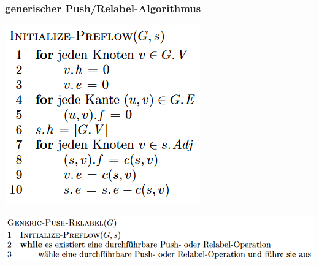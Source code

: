 \documentclass{beamer}
\newcommand{\pr}{Push/Relabel}
\begin{document}
\begin{frame}
\frametitle{generischer \pr -Algorithmus}
\centering
\begin{adjustbox}{width = 0.5\textwidth}
\includegraphics{../Grafiken/Init-Preflow.png}
\end{adjustbox}
\begin{adjustbox}{width = \textwidth}
\includegraphics{../Grafiken/Generic-PR.png}
\end{adjustbox}
\end{frame}
\end{document}

